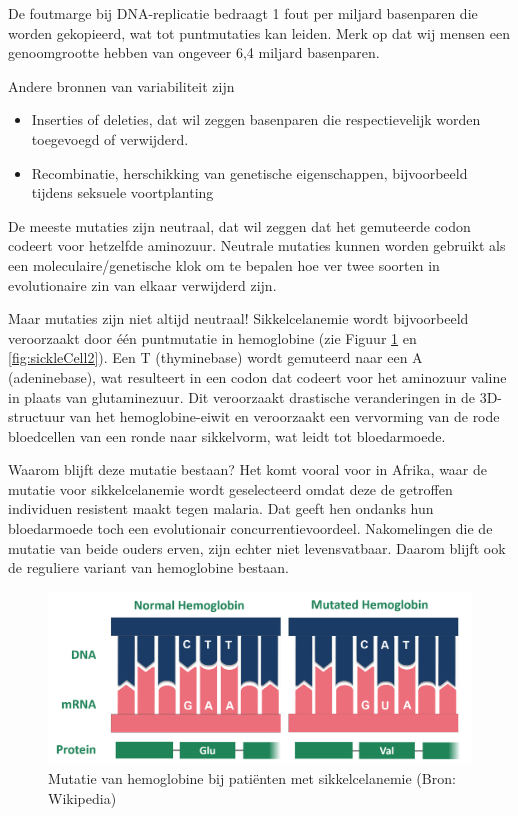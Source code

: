 \documentclass[
  11pt,
]{book}
\providecommand{\tightlist}{%
  \setlength{\itemsep}{0pt}\setlength{\parskip}{0pt}}
\begin{document}
De foutmarge bij DNA-replicatie bedraagt 1 fout per miljard basenparen die worden gekopieerd, wat tot puntmutaties kan leiden. Merk op dat wij mensen een genoomgrootte hebben van ongeveer 6,4 miljard basenparen.

Andere bronnen van variabiliteit zijn

\begin{itemize}
\tightlist
\item
  Inserties of deleties, dat wil zeggen basenparen die respectievelijk worden toegevoegd of verwijderd.
\item
  Recombinatie, herschikking van genetische eigenschappen, bijvoorbeeld tijdens seksuele voortplanting
\end{itemize}

De meeste mutaties zijn neutraal, dat wil zeggen dat het gemuteerde codon codeert voor hetzelfde aminozuur. Neutrale mutaties kunnen worden gebruikt als een moleculaire/genetische klok om te bepalen hoe ver twee soorten in evolutionaire zin van elkaar verwijderd zijn.

Maar mutaties zijn niet altijd neutraal! Sikkelcelanemie wordt bijvoorbeeld veroorzaakt door één puntmutatie in hemoglobine (zie Figuur \ref{fig:sickleCell1} en \ref{fig:sickleCell2}). Een T (thyminebase) wordt gemuteerd naar een A (adeninebase), wat resulteert in een codon dat codeert voor het aminozuur valine in plaats van glutaminezuur. Dit veroorzaakt drastische veranderingen in de 3D-structuur van het hemoglobine-eiwit en veroorzaakt een vervorming van de rode bloedcellen van een ronde naar sikkelvorm, wat leidt tot bloedarmoede.

Waarom blijft deze mutatie bestaan? Het komt vooral voor in Afrika, waar de mutatie voor sikkelcelanemie wordt geselecteerd omdat deze de getroffen individuen resistent maakt tegen malaria. Dat geeft hen ondanks hun bloedarmoede toch een evolutionair concurrentievoordeel. Nakomelingen die de mutatie van beide ouders erven, zijn echter niet levensvatbaar. Daarom blijft ook de reguliere variant van hemoglobine bestaan.

\begin{figure}

{\centering \includegraphics[width=0.45\linewidth]{./figs/sickleCellWikipedia2} 

}

\caption{Mutatie van hemoglobine bij patiënten met sikkelcelanemie (Bron: Wikipedia)}\label{fig:sickleCell1}
\end{figure}
\end{document}
